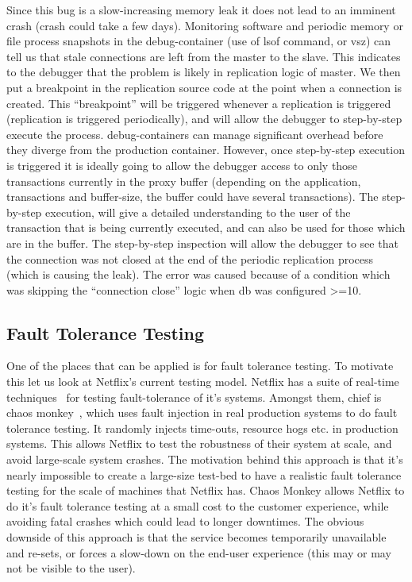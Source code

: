 Since this bug is a slow-increasing memory leak it does not lead to an imminent crash (crash could take a few days). 
Monitoring software and periodic memory or file process snapshots in the debug-container (use of lsof command, or vsz) can tell us that stale connections are left from the master to the slave.
This indicates to the debugger that the problem is likely in replication logic of master.
We then put a breakpoint in the replication source code at the point when a connection is created.
This ``breakpoint'' will be triggered whenever a replication is triggered (replication is triggered periodically), and will allow the debugger to step-by-step execute the process.
\parikshan debug-containers can manage significant overhead before they diverge from the production container. 
However, once step-by-step execution is triggered it is ideally going to allow the debugger access to only those transactions currently in the proxy buffer (depending on the application, transactions and buffer-size, the buffer could have several transactions). 
The step-by-step execution, will give a detailed understanding to the user of the transaction that is being currently executed, and can also be used for those which are in the buffer.
The step-by-step inspection will allow the debugger to see that the connection was not closed at the end of the periodic replication process (which is causing the leak).
The error was caused because of a condition which was skipping the ``connection close'' logic when db was configured \textgreater=10.


\subsection{Fault Tolerance Testing}

One of the places that \parikshan can be applied is for fault tolerance testing.
To motivate this let us look at Netflix's current testing model.
Netflix has a suite of real-time techniques~\cite{chaosengineering} for testing fault-tolerance of it's systems.
Amongst them, chief is chaos monkey~\cite{chaosmonkey}, which uses fault injection in real production systems to do fault tolerance testing.
It randomly injects time-outs, resource hogs etc. in production systems. 
This allows Netflix to test the robustness of their system at scale, and avoid large-scale system crashes. 
The motivation behind this approach is that it's nearly impossible to create a large-size test-bed to have a realistic fault tolerance testing for the scale of machines that Netflix has. 
Chaos Monkey allows Netflix to do it's fault tolerance testing at a small cost to the customer experience, while avoiding fatal crashes which could lead to longer downtimes.
The obvious downside of this approach is that the service becomes temporarily unavailable and re-sets, or forces a slow-down on the end-user experience (this may or may not be visible to the user). 

